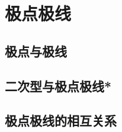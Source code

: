 \section{极点极线}
\label{sec:quadratic-poles-and-polars}


\subsection{极点与极线}
\label{subsec:quadratic-poles-and-polars}

\subsection{二次型与极点极线*}
\label{subsec:quadratic-quadratic-forms-and-polarity}

\subsection{极点极线的相互关系}
\label{subsec:quadratic-reciprocity}

